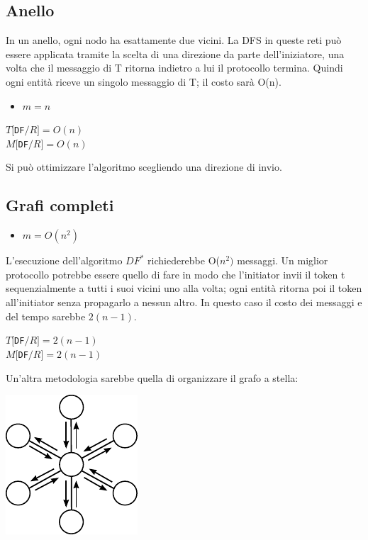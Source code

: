 \subsection{Anello}
In un anello, ogni nodo ha esattamente due vicini. La DFS in queste reti può
essere applicata tramite la scelta di una direzione da parte dell'iniziatore,
una volta che il messaggio di T ritorna indietro a lui il protocollo termina.
Quindi ogni entità riceve un singolo messaggio di T; il costo sarà O(n).
\begin{itemize}
    \item $m = n$
\end{itemize}
\begin{center}
    $T[$\texttt{DF}$/R] = O(n)$ \\
    $M[$\texttt{DF}$/R] = O(n)$
\end{center}
Si può ottimizzare l'algoritmo scegliendo una direzione di invio.

\subsection{Grafi completi}
\begin{itemize}
    \item $m = O(n^2)$
\end{itemize}
L'esecuzione dell'algoritmo $DF^*$ richiederebbe O($n^2)$ messaggi. Un miglior
protocollo potrebbe essere quello di fare in modo che l'initiator invii il token
t sequenzialmente a tutti i suoi vicini uno alla volta; ogni entità ritorna poi
il token all'initiator senza propagarlo a nessun altro. In questo caso il costo
dei messaggi e del tempo sarebbe $2(n-1)$.
\begin{center}
    $T[$\texttt{DF}$/R] = 2(n-1)$\\
    $M[$\texttt{DF}$/R] = 2(n-1)$
\end{center}
Un'altra metodologia sarebbe quella di organizzare il grafo a stella:
\begin{center}
    \includegraphics[scale=1]{capitoli/attraversamento/imgs/n_20}
\end{center}
